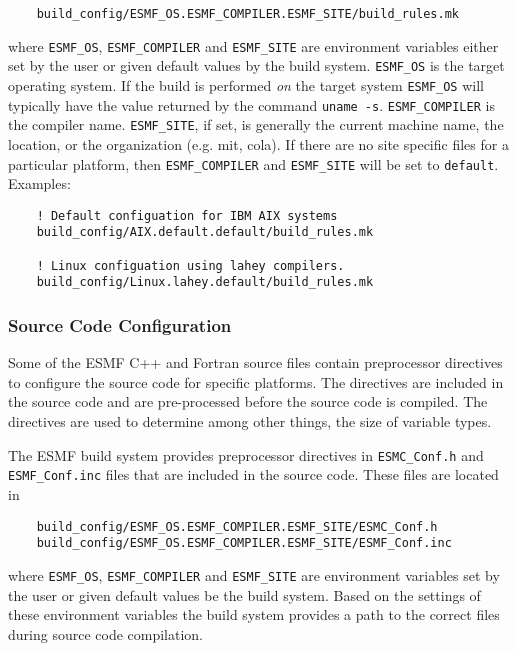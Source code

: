 \begin{verbatim}
    build_config/ESMF_OS.ESMF_COMPILER.ESMF_SITE/build_rules.mk
\end{verbatim}

where {\tt ESMF\_OS}, {\tt ESMF\_COMPILER} and {\tt ESMF\_SITE} are environment
variables either set by the user or given default values by the build
system. {\tt ESMF\_OS} is the target operating system. If the build is performed
{\em on} the target system {\tt ESMF\_OS} will typically have the value
returned by the command {\tt uname -s}. {\tt ESMF\_COMPILER} is the compiler
name. {\tt ESMF\_SITE}, if set, is generally the current machine name, the
location, or the organization (e.g. mit, cola).  If there are no site specific
files for a particular platform, then {\tt ESMF\_COMPILER} and {\tt ESMF\_SITE}
will be set to {\tt default}.  Examples:

\begin{verbatim}
    ! Default configuation for IBM AIX systems
    build_config/AIX.default.default/build_rules.mk
    
    ! Linux configuation using lahey compilers.    
    build_config/Linux.lahey.default/build_rules.mk
\end{verbatim}

\subsubsection{Source Code Configuration}

Some of the ESMF C++ and Fortran source files contain preprocessor directives
to configure the source code for specific platforms.  The directives are 
included in the source code and are pre-processed before the source code is 
compiled.  The directives are used to determine among other things, the size 
of variable types.

The ESMF build system provides preprocessor directives in 
{\tt ESMC\_Conf.h} and {\tt ESMF\_Conf.inc} files
that are included in the source code. These files are located in

\begin{verbatim}
    build_config/ESMF_OS.ESMF_COMPILER.ESMF_SITE/ESMC_Conf.h
    build_config/ESMF_OS.ESMF_COMPILER.ESMF_SITE/ESMF_Conf.inc
\end{verbatim}

where {\tt ESMF\_OS}, {\tt ESMF\_COMPILER} and {\tt ESMF\_SITE} are
environment variables set by the user or given default values be the
build system.  Based on the settings of these environment variables
the build system provides a path to the correct files during
source code compilation.

